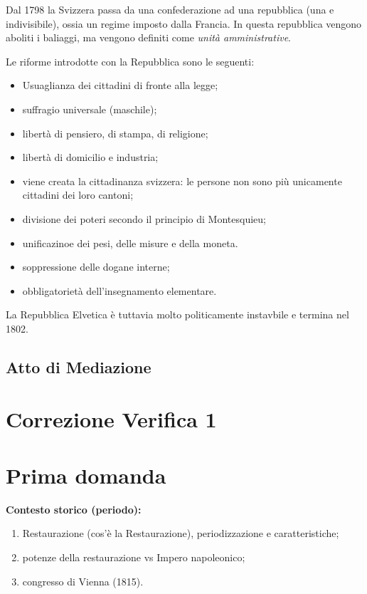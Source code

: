\documentclass[a4paper]{article}
\begin{document}
Dal 1798 la Svizzera passa da una confederazione ad una repubblica (una e indivisibile),
ossia un regime imposto dalla Francia.
In questa repubblica vengono aboliti i baliaggi, ma vengono definiti come \textit{unità amministrative}.


\pagebreak

Le riforme introdotte con la Repubblica sono le seguenti:
\begin{itemize}
    \item Usuaglianza dei cittadini di fronte alla legge;
    \item suffragio universale (maschile);
    \item libertà di pensiero, di stampa, di religione;
    \item libertà di domicilio e industria;
    \item viene creata la cittadinanza svizzera: le persone non sono più unicamente cittadini dei loro cantoni;
    \item divisione dei poteri secondo il principio di Montesquieu;
    \item unificazinoe dei pesi, delle misure e della moneta.
    \item soppressione delle dogane interne;
    \item obbligatorietà dell'insegnamento elementare.
\end{itemize}

La Repubblica Elvetica è tuttavia molto politicamente instavbile e termina nel 1802.

\subsection{Atto di Mediazione}


\pagebreak

\section{Correzione Verifica 1}

\section{Prima domanda}

\textbf{Contesto storico (periodo):}
\begin{enumerate}
    \item Restaurazione (cos'è la Restaurazione), periodizzazione e caratteristiche;
    \item potenze della restaurazione vs Impero napoleonico;
    \item congresso di Vienna (1815).
\end{enumerate}
\end{document}
